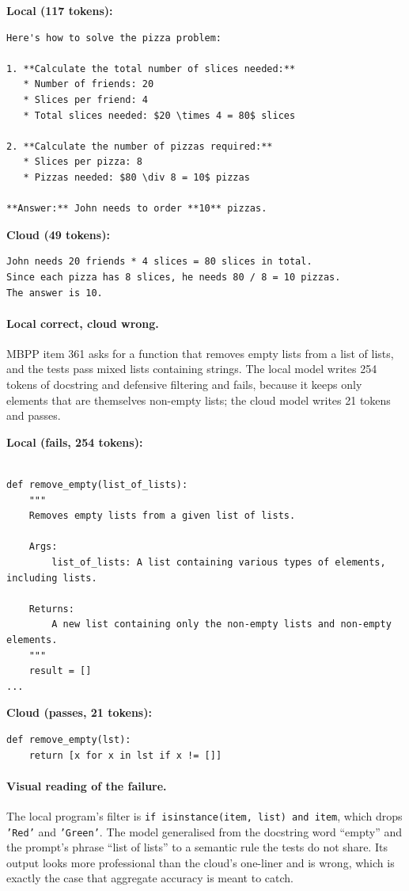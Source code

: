 \documentclass[11pt,a4paper]{article}
\begin{document}
\noindent\textbf{Local (117 tokens):}
{\footnotesize
\begin{verbatim}
Here's how to solve the pizza problem:

1. **Calculate the total number of slices needed:**
   * Number of friends: 20
   * Slices per friend: 4
   * Total slices needed: $20 \times 4 = 80$ slices

2. **Calculate the number of pizzas required:**
   * Slices per pizza: 8
   * Pizzas needed: $80 \div 8 = 10$ pizzas

**Answer:** John needs to order **10** pizzas.
\end{verbatim}}

\noindent\textbf{Cloud (49 tokens):}
{\footnotesize
\begin{verbatim}
John needs 20 friends * 4 slices = 80 slices in total.
Since each pizza has 8 slices, he needs 80 / 8 = 10 pizzas.
The answer is 10.
\end{verbatim}}

\paragraph{Local correct, cloud wrong.}
MBPP item 361 asks for a function that removes empty lists from a list of
lists, and the tests pass mixed lists containing strings. The local model writes
254 tokens of docstring and defensive filtering and fails, because
it keeps only elements that are themselves non-empty lists; the cloud model
writes 21 tokens and passes.

\noindent\textbf{Local (fails, 254 tokens):}
{\footnotesize
\begin{verbatim}

def remove_empty(list_of_lists):
    """
    Removes empty lists from a given list of lists.

    Args:
        list_of_lists: A list containing various types of elements, including lists.

    Returns:
        A new list containing only the non-empty lists and non-empty elements.
    """
    result = []
...
\end{verbatim}}

\noindent\textbf{Cloud (passes, 21 tokens):}
{\footnotesize
\begin{verbatim}
def remove_empty(lst):
    return [x for x in lst if x != []]
\end{verbatim}}

\paragraph{Visual reading of the failure.}
The local program's filter is \texttt{if isinstance(item, list) and item},
which drops \texttt{'Red'} and \texttt{'Green'}. The model generalised from the
docstring word ``empty'' and the prompt's phrase ``list of lists'' to a
semantic rule the tests do not share. Its output looks more professional than
the cloud's one-liner and is wrong, which is exactly the case that aggregate
accuracy is meant to catch.
\end{document}
